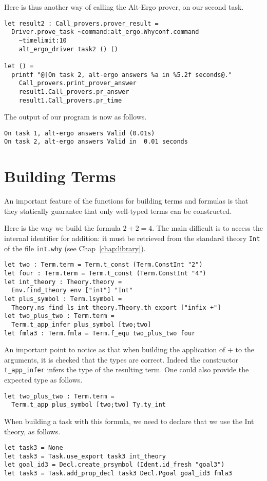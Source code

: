 Here is thus another way of calling the Alt-Ergo prover, on our second task.
\begin{verbatim}
let result2 : Call_provers.prover_result = 
  Driver.prove_task ~command:alt_ergo.Whyconf.command
    ~timelimit:10
    alt_ergo_driver task2 () ()

let () = 
  printf "@[On task 2, alt-ergo answers %a in %5.2f seconds@."
    Call_provers.print_prover_answer 
    result1.Call_provers.pr_answer
    result1.Call_provers.pr_time
\end{verbatim}
The output of our program is now as follows.
\begin{verbatim}
On task 1, alt-ergo answers Valid (0.01s)
On task 2, alt-ergo answers Valid in  0.01 seconds
\end{verbatim}

\section{Building Terms}

An important feature of the functions for building terms and formulas
is that they statically guarantee that only well-typed terms can be
constructed.

Here is the way we build the formula $2+2=4$. The main difficult is to
access the internal identifier for addition: it must be retrieved from
the standard theory \texttt{Int} of the file \texttt{int.why} (see
Chap~\ref{chap:library}).
\begin{verbatim}
let two : Term.term = Term.t_const (Term.ConstInt "2")
let four : Term.term = Term.t_const (Term.ConstInt "4")
let int_theory : Theory.theory = 
  Env.find_theory env ["int"] "Int"
let plus_symbol : Term.lsymbol = 
  Theory.ns_find_ls int_theory.Theory.th_export ["infix +"]
let two_plus_two : Term.term = 
  Term.t_app_infer plus_symbol [two;two] 
let fmla3 : Term.fmla = Term.f_equ two_plus_two four
\end{verbatim}
An important point to notice as that when building the application of
$+$ to the arguments, it is checked that the types are correct. Indeed
the constructor \texttt{t\_app\_infer} infers the type of the resulting
term. One could also provide the expected type as follows.
\begin{verbatim}
let two_plus_two : Term.term = 
  Term.t_app plus_symbol [two;two] Ty.ty_int
\end{verbatim}

When building a task with this formula, we need to declare that we use the Int theory, as follows.
\begin{verbatim}
let task3 = None
let task3 = Task.use_export task3 int_theory
let goal_id3 = Decl.create_prsymbol (Ident.id_fresh "goal3") 
let task3 = Task.add_prop_decl task3 Decl.Pgoal goal_id3 fmla3
\end{verbatim}


